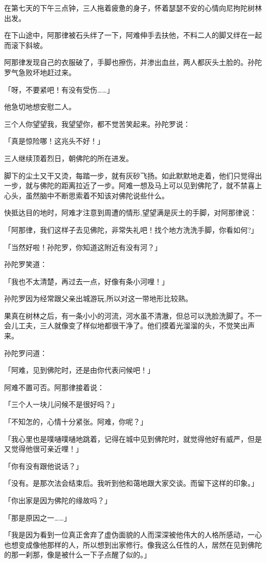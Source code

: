 \documentclass[twoside,openany]{book}
\begin{document}
在第七天的下午三点钟，三人拖着疲惫的身子，怀着瑟瑟不安的心情向尼拘陀树林出发。

在下山途中，阿那律被石头绊了一下，阿难伸手去扶他，不料二人的脚又绊在一起而滚下斜坡。

阿那律发现自己的衣服破了，手脚也擦伤，并渗出血丝，两人都灰头土脸的。孙陀罗气急败坏地赶过来。

「呀，不要紧吧！有没有受伤……」

他急切地想安慰二人。

三个人你望望我，我望望你，都不觉苦笑起来。孙陀罗说：

「真是惊险哪！这兆头不好！」

三人继续顶着烈日，朝佛陀的所在进发。

脚下的尘土又干又烫，每踏一步，就有灰砂飞扬。如此默默地走着，他们只觉得出一步，就与佛陀的距离拉近了一步。阿难一想及马上可以见到佛陀了，就不禁喜上心头，虽然脑中不断思索着不知该对佛陀说些什么。

快抵达目的地时，阿难才注意到周遭的情形,望望满是灰土的手脚，对阿那律说：

「阿那律，我们这样子去见佛陀，非常失礼吧！找个地方洗洗手脚，你看如何?」

「当然好啦！孙陀罗，你知道这附近有没有河？」

孙陀罗笑道：

「我也不太清楚，再过去一点，好像有条小河哩！」

孙陀罗因为经常跟父亲出城游玩,所以对这一带地形比较熟。

果真在树林之后，有一条小小的河流，河水虽不清澈，但总可以洗脸洗脚了。不一会儿工夫，三人就像变了样似地都很干净了。他们摸着光溜溜的头，不觉笑出声来。

孙陀罗问道：

「阿难，见到佛陀时，还是由你代表问候吧！」

阿难不置可否。阿那律接着说：

「三个人一块儿问候不是很好吗？」

「不知怎的，心情十分紧张。阿难，你呢？」

「我心里也是噗嗵噗嗵地跳着，记得在城中见到佛陀时，就觉得他好有威严，但是又觉得他很可亲近哩！」

「你有没有跟他说话？」

「没有。是那次法会结束后。我听到他和蔼地跟大家交谈。而留下这样的印象。」

「你出家是因为佛陀的缘故吗？」

「那是原因之一……」

「我是因为看到一位真正舍弃了虚伪面貌的人而深深被他伟大的人格所感动，一心也想变成像他那样的人，所以想到出家修行。像我这么任性的人，居然在见到佛陀的那一刹那，像是被什么一下子点醒了似的。」
\end{document}
